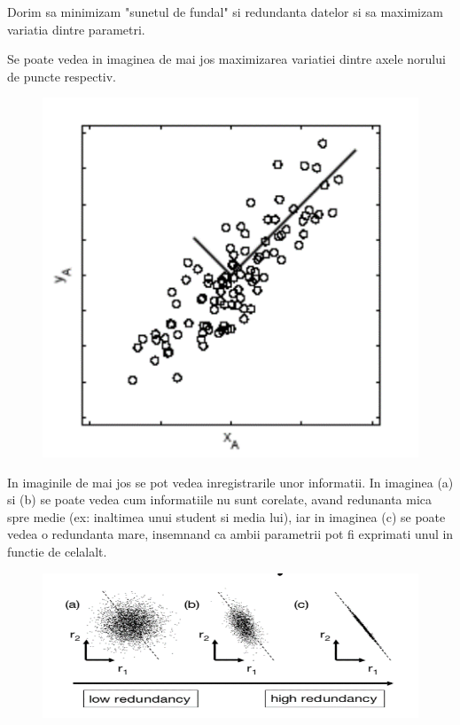 \documentclass[12pt,oneside]{article}
\begin{document}
Dorim sa minimizam "sunetul de fundal" si redundanta datelor si sa maximizam variatia dintre parametri.

Se poate vedea in imaginea de mai jos maximizarea variatiei dintre axele norului de puncte respectiv.\cite{pca_shlens}

\begin{figure}[H]
\centering
\includegraphics[scale=0.5]{Picture1}
\end{figure}

In imaginile de mai jos se pot vedea inregistrarile unor informatii. In imaginea (a) si (b) se poate vedea cum informatiile nu sunt corelate, avand redunanta mica spre medie (ex: inaltimea unui student si media lui), iar in imaginea (c) se poate vedea o redundanta mare, insemnand ca ambii parametrii pot fi exprimati unul in functie de celalalt.\cite{pca_shlens}

\begin{figure}[H]
\centering
\includegraphics[width=\linewidth]{Picture2}
\end{figure}
\end{document}
